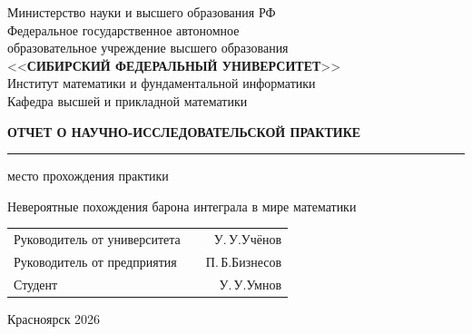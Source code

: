 \begin{titlepage}
\begin{center}
Министерство науки и высшего образования РФ\\
Федеральное государственное автономное \\
образовательное учреждение высшего образования\\
<<\textbf{СИБИРСКИЙ ФЕДЕРАЛЬНЫЙ УНИВЕРСИТЕТ}>> \\
Институт математики и фундаментальной информатики\\
Кафедра высшей и прикладной математики
\end{center}

\vspace*{\fill}

\begin{center}

\textbf{ОТЧЕТ О НАУЧНО-ИССЛЕДОВАТЕЛЬСКОЙ ПРАКТИКЕ}
\vspace{3mm}

\rule{.7\textwidth}{1pt}%

\vspace{-10pt}%
{\small место прохождения практики}%

Невероятные похождения барона интеграла в мире математики %
 \end{center}
\vspace{25mm}

\vspace*{\fill}
\begin{center}
\begin{tabular}{p{}cr}
	Руководитель от университета & \underline{\hspace{2cm}}  & У.\,У.\;Учёнов\\
	Руководитель от предприятия & \underline{\hspace{2cm}}   & П.\,Б.\;Бизнесов\\
	Студент \quad \underline{\hspace{4cm}}&  \underline{\hspace{2cm}} & У.\,У.\;Умнов
\end{tabular}
\end{center}
\vspace*{\fill}

\begin{center}

{Красноярск 2026}

\end{center}
\end{titlepage}

